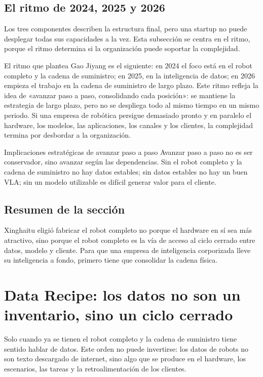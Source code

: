 \documentclass[a4paper]{article}
\begin{document}
\subsection{El ritmo de 2024, 2025 y 2026}

Los tres componentes describen la estructura final, pero una startup no puede desplegar todas sus capacidades a la vez. Esta subsección se centra en el ritmo, porque el ritmo determina si la organización puede soportar la complejidad.

El ritmo que plantea Gao Jiyang es el siguiente: en 2024 el foco está en el robot completo y la cadena de suministro; en 2025, en la inteligencia de datos; en 2026 empieza el trabajo en la cadena de suministro de largo plazo. Este ritmo refleja la idea de «avanzar paso a paso, consolidando cada posición»: se mantiene la estrategia de largo plazo, pero no se despliega todo al mismo tiempo en un mismo periodo. Si una empresa de robótica persigue demasiado pronto y en paralelo el hardware, los modelos, las aplicaciones, los canales y los clientes, la complejidad termina por desbordar a la organización.

\begin{importantbox}{Implicaciones estratégicas de avanzar paso a paso}
Avanzar paso a paso no es ser conservador, sino avanzar según las dependencias. Sin el robot completo y la cadena de suministro no hay datos estables; sin datos estables no hay un buen VLA; sin un modelo utilizable es difícil generar valor para el cliente.
\end{importantbox}

\subsection{Resumen de la sección}

Xinghaitu eligió fabricar el robot completo no porque el hardware en sí sea más atractivo, sino porque el robot completo es la vía de acceso al ciclo cerrado entre datos, modelo y cliente. Para que una empresa de inteligencia corporizada lleve su inteligencia a fondo, primero tiene que consolidar la cadena física.
\section{Data Recipe: los datos no son un inventario, sino un ciclo cerrado}

Solo cuando ya se tienen el robot completo y la cadena de suministro tiene sentido hablar de datos. Este orden no puede invertirse: los datos de robots no son texto descargado de internet, sino algo que se produce en el hardware, los escenarios, las tareas y la retroalimentación de los clientes.
\end{document}
